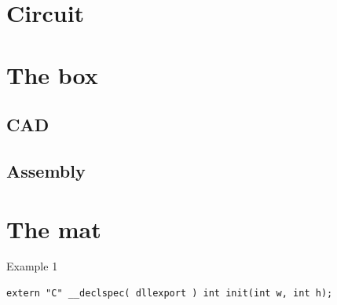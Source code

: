 \section{Circuit}


\section{The box}%

	\subsection{CAD}
		
	\subsection{Assembly}

\section{The mat}%

\begin{listing}[H]
	\caption{Example 1}
	\label{listing:example1}
	\begin{verbatim}
extern "C" __declspec( dllexport ) int init(int w, int h);
	\end{verbatim}
\end{listing}